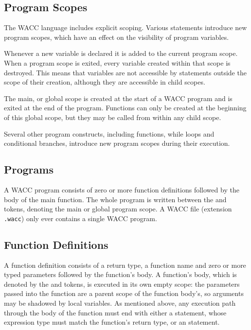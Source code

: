 \documentclass[a4paper]{article}
\theoremstyle{definition}
\begin{document}
\subsection{Program Scopes}
The WACC language includes explicit scoping.
Various statements introduce new program scopes, which have an effect on the visibility of program variables.

Whenever a new variable is declared it is added to the current program scope.
When a program scope is exited, every variable created within that scope is destroyed.
This means that variables are not accessible by statements outside the scope of their creation,
although they are accessible in child scopes.

The main, or global scope is created at the start of a WACC program and is exited at the end of the program.
Functions can only be created at the beginning of this global scope, but they may be called from within any child scope.

Several other program constructs, including functions, while loops and conditional branches,
introduce new program scopes during their execution.

\subsection{Programs}
A WACC program  consists of zero or more function definitions followed by the body of the main function.
The whole program is written between the  and  tokens, denoting the main or global program scope.
A WACC file (extension {\tt .wacc}) only ever contains a single WACC program.

\subsection{Function Definitions}
A function definition  consists of a return type, a function name
and zero or more typed parameters followed by the function's body.
A function's body, which is denoted by the  and  tokens, is executed in its own empty scope:
the parameters passed into the function are a parent scope of the function body's, so arguments may be shadowed by
local variables.
As mentioned above, any execution path through the body of the function must end with either a  statement,
whose expression type must match the function's return type, or an  statement.
\end{document}
